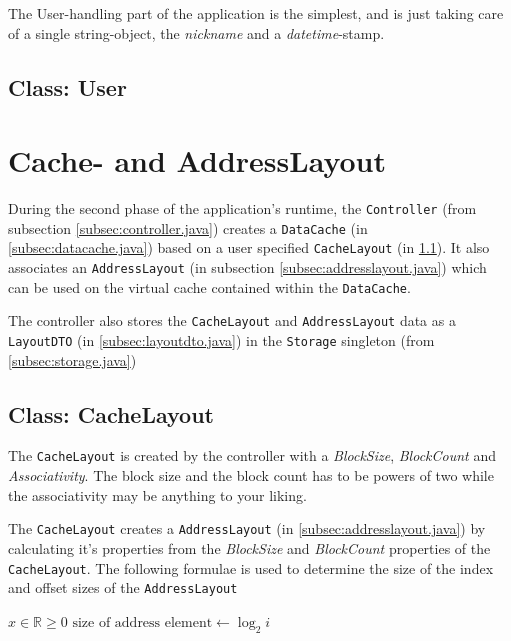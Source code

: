 \documentclass[a4paper]{scrreprt}
\begin{document}
The User-handling part of the application is the simplest, and is just taking care of a single string-object, the \textit{nickname} and a \textit{datetime}-stamp.

\subsection{Class: User}
\label{subsec:user.java}


\section{Cache- and AddressLayout}
\label{sec:cache}

During the second phase of the application's runtime, the \texttt{Controller} (from subsection \ref{subsec:controller.java}) creates a \texttt{DataCache} (in \ref{subsec:datacache.java}) based on a user specified \texttt{CacheLayout} (in \ref{subsec:cachelayout.java}). It also associates an \texttt{AddressLayout} (in subsection \ref{subsec:addresslayout.java}) which can be used on the virtual cache contained within the \texttt{DataCache}.

The controller also stores the \texttt{CacheLayout} and \texttt{AddressLayout} data as a \texttt{LayoutDTO} (in \ref{subsec:layoutdto.java}) in the \texttt{Storage} singleton (from \ref{subsec:storage.java}) 

\subsection{Class: CacheLayout}
\label{subsec:cachelayout.java}

The \texttt{CacheLayout} is created by the controller with a \textit{BlockSize}, \textit{BlockCount} and \textit{Associativity}. The block size and the block count has to be powers of two while the associativity may be anything to your liking.

The \texttt{CacheLayout} creates a \texttt{AddressLayout} (in \ref{subsec:addresslayout.java}) by calculating it's properties from the \textit{BlockSize} and \textit{BlockCount} properties of the \texttt{CacheLayout}.
The following formulae is used to determine the size of the index and offset sizes of the \texttt{AddressLayout}

\begin{algorithmic}
\State $x \in \mathbb{R} \geq 0$ 
    \State $\text{size of address element} \gets \log _2 i$ 
\EndIf
\end{algorithmic}
\end{document}
